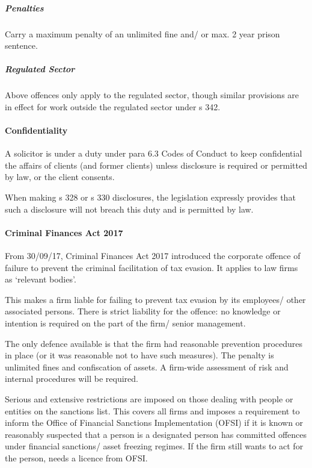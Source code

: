 \documentclass[
]{article}
\begin{document}
\hypertarget{penalties}{%
\subparagraph{Penalties}\label{penalties}}

Carry a maximum penalty of an unlimited fine and/ or max. 2 year prison
sentence.

\hypertarget{regulated-sector}{%
\subparagraph{Regulated Sector}\label{regulated-sector}}

Above offences only apply to the regulated sector, though similar
provisions are in effect for work outside the regulated sector under s
342.

\hypertarget{confidentiality-1}{%
\paragraph{Confidentiality}\label{confidentiality-1}}

A solicitor is under a duty under para 6.3 Codes of Conduct to keep
confidential the affairs of clients (and former clients) unless
disclosure is required or permitted by law, or the client consents.

When making s 328 or s 330 disclosures, the legislation expressly
provides that such a disclosure will not breach this duty and is
permitted by law.

\hypertarget{criminal-finances-act-2017}{%
\paragraph{Criminal Finances Act
2017}\label{criminal-finances-act-2017}}

From 30/09/17, Criminal Finances Act 2017 introduced the corporate
offence of failure to prevent the criminal facilitation of tax evasion.
It applies to law firms as `relevant bodies'.

This makes a firm liable for failing to prevent tax evasion by its
employees/ other associated persons. There is strict liability for the
offence: no knowledge or intention is required on the part of the firm/
senior management.

The only defence available is that the firm had reasonable prevention
procedures in place (or it was reasonable not to have such measures).
The penalty is unlimited fines and confiscation of assets. A firm-wide
assessment of risk and internal procedures will be required.

Serious and extensive restrictions are imposed on those dealing with
people or entities on the sanctions list. This covers all firms and
imposes a requirement to inform the Office of Financial Sanctions
Implementation (OFSI) if it is known or reasonably suspected that a
person is a designated person has committed offences under financial
sanctions/ asset freezing regimes. If the firm still wants to act for
the person, needs a licence from OFSI.
\end{document}
